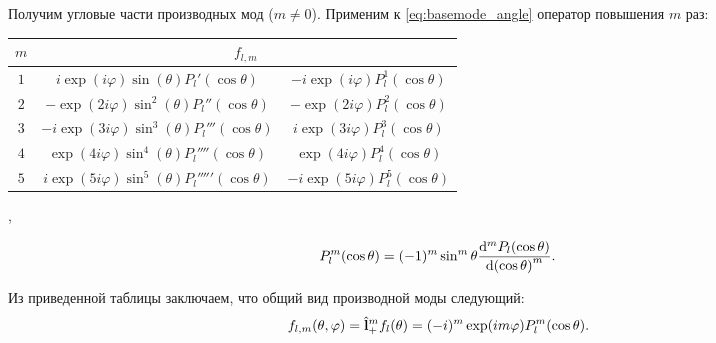 \documentclass{beamer}
\begin{document}
    \begin{frame}

        Получим угловые части производных мод ($m \neq 0$). Применим к \autoref{eq:basemode_angle} оператор повышения $m$ раз:
        \begin{center}
            \begin{tabular}{|c|c|c|}\hline
                $m$ & \multicolumn{2}{|c|}{$f_{l,m}$} \\ \hline
                $1$ & $i \exp(i\varphi) \sin(\theta) {P_l}'(\cos\theta)$
                    & $- i \exp(i\varphi) P^1_l(\cos\theta)$ \\ \hline
                $2$ & $- \exp(2i\varphi) \sin^2(\theta) {P_l}''(\cos\theta)$
                    & $- \exp(2i\varphi) P^2_l(\cos\theta)$ \\ \hline
                $3$ & $- i \exp(3i\varphi) \sin^3(\theta) {P_l}'''(\cos\theta)$
                    & $i \exp(3i\varphi) P^3_l(\cos\theta)$ \\ \hline
                $4$ & $\exp(4i\varphi) \sin^4(\theta) {P_l}''''(\cos\theta)$
                    & $\exp(4i\varphi) P^4_l(\cos\theta)$ \\ \hline
                $5$ & $i \exp(5i\varphi) \sin^5(\theta) {P_l}'''''(\cos\theta)$
                    & $- i \exp(5i\varphi) P^5_l(\cos\theta)$ \\ \hline
            \end{tabular} ,
        \end{center}
        \begin{equation}
            P^m_l(\cos\theta) = (-1)^m \sin^m \theta \dv[m]{P_l\qty(\cos\theta)}{\qty(\cos\theta)} .
        \end{equation}

        Из приведенной таблицы заключаем, что общий вид производной моды следующий:
        \begin{equation}
            f_{l,m}(\theta,\varphi)
                = \hat{\mathbf{l}}^m_{+} f_l(\theta)
                = (-i)^m \exp(i m \varphi) P^m_l\qty(\cos\theta) .
        \end{equation}

    \end{frame}

\end{document}
